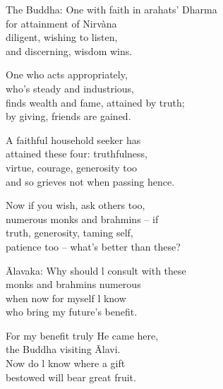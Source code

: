\begin{MyDescription}{The Buddha:}
One with faith in arahats' Dharma\\
for attainment of Nirv\`ana\\
diligent, wishing to listen,\\
and discerning, wisdom wins.
\end{MyDescription}    

\begin{MyDescription}{}
One who acts appropriately,\\
who's steady and industrious,\\
ﬁnds wealth and fame, attained by truth;\\
by giving, friends are gained.
\end{MyDescription}    
   
\begin{MyDescription}{}
A faithful household seeker has\\
attained these four: truthfulness,\\
virtue, courage, generosity too\\
and so grieves not when passing hence.
\end{MyDescription}  

\begin{MyDescription}{}
Now if you wish, ask others too,\\
numerous monks and brahmins -- if\\
truth, generosity, taming self,\\
patience too -- what's better than these? 
\end{MyDescription}  

\begin{MyDescription}{\=Alavaka:}
Why should l consult with these\\
monks and brahmins numerous\\
when now for myself l know\\
who bring my future's beneﬁt.
\end{MyDescription}  

\begin{MyDescription}{}
For my beneﬁt truly He came here,\\
the Buddha visiting \=Alavi.\\
Now do l know where a gift\\
bestowed will bear great fruit.\\
\end{MyDescription}  

